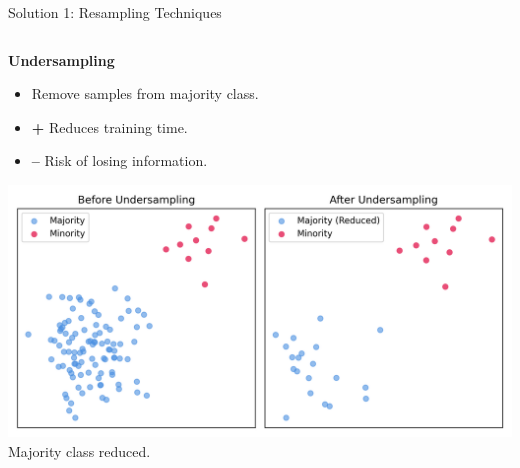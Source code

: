 \documentclass[serif, aspectratio=169]{beamer}
\begin{document}
    \begin{frame}{Solution 1: Resampling Techniques}
        \begin{columns}[T]
            \begin{column}{0.48\textwidth}
                \textbf{Undersampling}
                \begin{itemize}\itemsep0.8em
                \item Remove samples from majority class.
                \item \textbf{+} Reduces training time.
                \item \textbf{--} Risk of losing information.
                \end{itemize}
                \vspace{0.8em}
                \includegraphics[width=\textwidth]{pic/Figure_33.png}\\
                \scriptsize Majority class reduced.
            \end{column}


\end{columns}
\end{frame}
\end{document}
